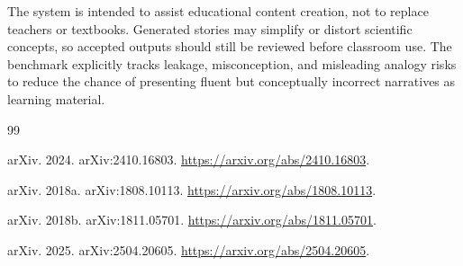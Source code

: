 \documentclass[letterpaper]{article} %
\begin{document}
The system is intended to assist educational content creation, not to replace teachers or textbooks. Generated stories may simplify or distort scientific concepts, so accepted outputs should still be reviewed before classroom use. The benchmark explicitly tracks leakage, misconception, and misleading analogy risks to reduce the chance of presenting fluent but conceptually incorrect narratives as learning material.

\begin{thebibliography}{99}

arXiv. 2024.
\newblock arXiv:2410.16803.
\newblock \url{https://arxiv.org/abs/2410.16803}.

arXiv. 2018a.
\newblock arXiv:1808.10113.
\newblock \url{https://arxiv.org/abs/1808.10113}.

arXiv. 2018b.
\newblock arXiv:1811.05701.
\newblock \url{https://arxiv.org/abs/1811.05701}.

arXiv. 2025.
\newblock arXiv:2504.20605.
\newblock \url{https://arxiv.org/abs/2504.20605}.

\end{thebibliography}
\end{document}
